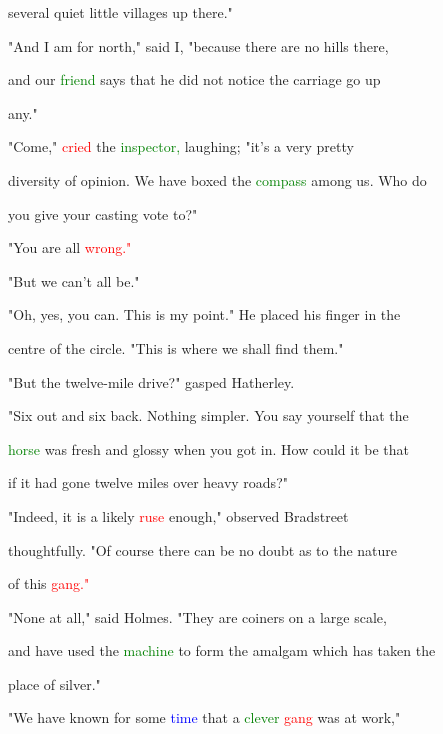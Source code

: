  several \textcolor{BurntOrange}{quiet} little villages up there."



 "And I am for north," said I, "because there are no hills there,

 and our \textcolor{green}{friend} says that he did not notice the carriage go up

 any."



 "Come," \textcolor{red}{cried} the \textcolor{green}{inspector,} \textcolor{BurntOrange}{laughing;} "it's a very \textcolor{BurntOrange}{pretty}

 diversity of opinion. We have boxed the \textcolor{green}{compass} among us. Who do

 you give your casting \textcolor{BurntOrange}{vote} to?"



 "You are all \textcolor{red}{wrong."}



 "But we can't all be."



 "Oh, yes, you can. This is my point." He placed his finger in the

 centre of the circle. "This is where we shall find them."



 "But the twelve-mile drive?" gasped Hatherley.



 "Six out and six back. Nothing simpler. You say yourself that the

 \textcolor{green}{horse} was fresh and glossy when you got in. How could it be that

 if it had gone twelve miles over heavy roads?"



 "Indeed, it is a likely \textcolor{red}{ruse} enough," observed Bradstreet

 thoughtfully. "Of course there can be no \textcolor{BurntOrange}{doubt} as to the nature

 of this \textcolor{red}{gang."}



 "None at all," said Holmes. "They are coiners on a large scale,

 and have used the \textcolor{green}{machine} to form the amalgam which has taken the

 place of silver."



 "We have known for some \textcolor{blue}{time} that a \textcolor{green}{clever} \textcolor{red}{gang} was at work,"

